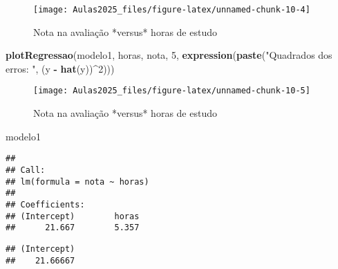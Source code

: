 \documentclass[
]{book}
\newenvironment{Shaded}{\begin{snugshade}}{\end{snugshade}}
\newcommand{\DecValTok}[1]{\textcolor[rgb]{0.00,0.00,0.81}{#1}}
\newcommand{\FunctionTok}[1]{\textcolor[rgb]{0.13,0.29,0.53}{\textbf{#1}}}
\newcommand{\NormalTok}[1]{#1}
\newcommand{\SpecialCharTok}[1]{\textcolor[rgb]{0.81,0.36,0.00}{\textbf{#1}}}
\newcommand{\StringTok}[1]{\textcolor[rgb]{0.31,0.60,0.02}{#1}}
\begin{document}
\begin{figure}

{\centering \texttt{[image: Aulas2025\_files/figure-latex/unnamed-chunk-10-4]} 

}

\caption{Nota na avaliação *versus* horas de estudo}\label{fig:unnamed-chunk-10-4}
\end{figure}

\begin{Shaded}
\begin{Highlighting}[]
\FunctionTok{plotRegressao}\NormalTok{(modelo1, horas, nota, }\DecValTok{5}\NormalTok{, }\FunctionTok{expression}\NormalTok{(}\FunctionTok{paste}\NormalTok{(}\StringTok{"Quadrados dos erros: "}\NormalTok{,}
\NormalTok{    (y }\SpecialCharTok{{-}} \FunctionTok{hat}\NormalTok{(y))}\SpecialCharTok{\^{}}\DecValTok{2}\NormalTok{)))}
\end{Highlighting}
\end{Shaded}

\begin{figure}

{\centering \texttt{[image: Aulas2025\_files/figure-latex/unnamed-chunk-10-5]} 

}

\caption{Nota na avaliação *versus* horas de estudo}\label{fig:unnamed-chunk-10-5}
\end{figure}

\begin{Shaded}
\begin{Highlighting}[]
\NormalTok{modelo1}
\end{Highlighting}
\end{Shaded}

\begin{verbatim}
## 
## Call:
## lm(formula = nota ~ horas)
## 
## Coefficients:
## (Intercept)        horas  
##      21.667        5.357
\end{verbatim}

\begin{Shaded}
\end{Shaded}

\begin{verbatim}
## (Intercept) 
##    21.66667
\end{verbatim}

\begin{Shaded}
\end{Shaded}
\end{document}
